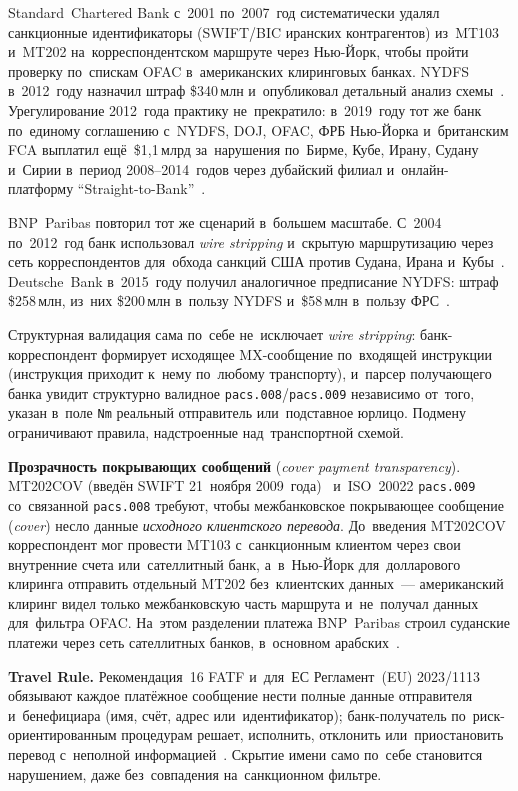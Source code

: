 Standard~Chartered Bank с~2001 по~2007~год систематически удалял санкционные
идентификаторы (SWIFT/BIC иранских контрагентов) из~MT103 и~MT202
на~корреспондентском маршруте через Нью-Йорк, чтобы пройти проверку по~спискам OFAC
в~американских клиринговых банках. NYDFS в~2012~году назначил штраф \$340\,млн
и~опубликовал детальный анализ схемы~\cite{nydfs-stanchart-wire-stripping-2012}.
Урегулирование 2012~года практику не~прекратило: в~2019~году тот же банк
по~единому соглашению с~NYDFS, DOJ, OFAC, ФРБ Нью-Йорка и~британским FCA
выплатил ещё~\$1,1\,млрд за~нарушения по~Бирме, Кубе, Ирану, Судану и~Сирии
в~период 2008--2014~годов через дубайский филиал и~онлайн-платформу
\enquote{Straight-to-Bank}~\cite{nydfs-stanchart-2019}.

BNP~Paribas повторил тот же сценарий в~большем масштабе. С~2004 по~2012~год
банк использовал \textit{wire stripping} и~скрытую маршрутизацию через сеть
корреспондентов для~обхода санкций США против Судана, Ирана и~Кубы~\cite{doj-bnp-2014}.
Deutsche~Bank в~2015~году получил аналогичное предписание NYDFS: штраф
\$258\,млн, из~них \$200\,млн в~пользу NYDFS и~\$58\,млн в~пользу
ФРС~\cite{nydfs-deutsche-2015}.

Структурная валидация сама по~себе не~исключает \textit{wire stripping}:
банк-корреспон\-дент формирует исходящее MX-сообщение по~входящей инструкции
(инструкция приходит к~нему по~любому транспорту), и~парсер получающего банка
увидит структурно валидное \texttt{pacs.008}\slash\texttt{pacs.009} независимо
от~того, указан в~поле \texttt{Nm} реальный отправитель или~подставное юрлицо.
Подмену ограничивают правила, надстроенные над~транспортной схемой.

\textbf{Прозрачность покрывающих сообщений} (\textit{cover payment transparency}). MT202COV (введён SWIFT 21~ноября 2009~года)~\cite{basel-cover-payments-2009}
и~ISO~20022 \texttt{pacs.009} со~связанной \texttt{pacs.008} требуют, чтобы
межбанковское покрывающее сообщение (\textit{cover}) несло данные \textit{исходного клиентского перевода}.
До~введения MT202COV корреспондент мог провести MT103 с~санкционным клиентом
через свои внутренние счета или~сателлитный банк, а~в~Нью-Йорк
для~долларового клиринга отправить отдельный MT202 без~клиентских данных~---
американский клиринг видел только межбанковскую часть маршрута и~не~получал
данных для~фильтра OFAC. На~этом разделении платежа BNP~Paribas строил суданские
платежи через сеть сателлитных банков, в~основном
арабских~\cite{doj-sdny-bnp-plea-2014}.

\textbf{Travel Rule.} Рекомендация~16 FATF и~для~ЕС Регламент~(EU)
2023/1113 обязывают каждое платёжное сообщение нести полные данные отправителя
и~бенефициара (имя, счёт, адрес или~идентификатор); банк-получатель по~риск-ориентированным
процедурам решает, исполнить, отклонить или~приостановить перевод
с~неполной информацией~\cite{fatf-recs,eba-travel-rule-2024}.
Скрытие имени само по~себе становится нарушением, даже без~совпадения
на~санкционном фильтре.

